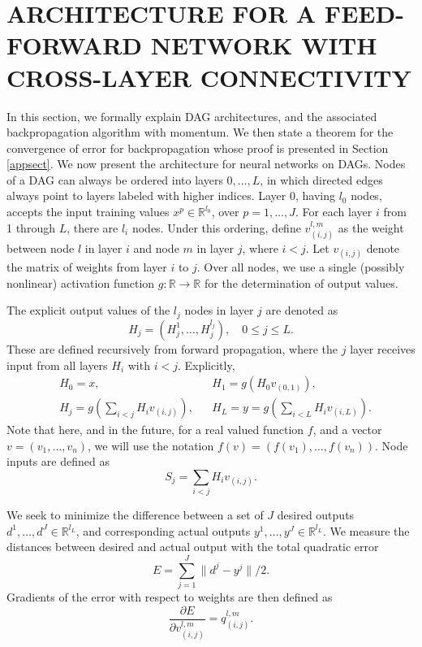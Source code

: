 \documentclass{jcmlatex}
\begin{document}
\section{ARCHITECTURE FOR A FEED-FORWARD NETWORK
WITH CROSS-LAYER CONNECTIVITY}\label{sec:architecture}

In this section, we formally explain  DAG architectures, and the associated backpropagation algorithm with momentum.  We then state a theorem for the convergence of error for backpropagation whose proof is presented in Section \ref{appsect}.
We now present the architecture for neural networks on DAGs. Nodes of a  DAG can always be ordered into layers $0, \dots, L$, in which directed edges always point to layers labeled with higher indices.  Layer 0, having $l_0$ nodes,  accepts the input training values $x^p \in \mathbb R^{l_0}$, over $ p = 1, \dots, J$.  For each layer $i$  from 1 through $L$, there are $l_i$ nodes. Under this ordering, define $v_{(i,j)}^{l,m}$ as the weight between node $l$ in layer $i$ and node $m$ in layer $j$, where $i<j$. Let $v_{(i,j)}$ denote the matrix of weights from layer $i$ to $j$. Over all nodes, we use a single (possibly nonlinear) activation function $g:\mathbb R\rightarrow \mathbb R$  for the determination of output values.

The explicit output values of the $l_j$ nodes in layer $j$ are denoted as
\begin{equation}
H_j = (H_j^1, \dots, H_j^{l_j}), \quad 0 \le j \le L.
\end{equation}
These are defined recursively from forward propagation, where the $j$ layer receives input from all layers $H_i$ with $i<j$. Explicitly,
\begin{align}
&H_0 = x,  &&H_1 = g\left(H_0 v_{(0,1)} \right),\\
&H_j = g\left(\sum_{i < j} H_iv_{(i,j)} \right),  &&H_L = y = g\left(\sum_{i <L } H_iv_{(i,L)} \right).\label{nodeeqn}
\end{align}
 Note that here, and in the future, for
a real valued function $f$, and a vector $v= (v_1, \dots, v_n)$, we will use
the notation $f(v) = (f(v_1), \dots, f(v_n))$. Node inputs are defined as
 \begin{equation}
 S_j= \sum_{i < j} H_iv_{(i,j)}.
 \end{equation}

We seek to minimize the difference between a set of  $J$ desired outputs $d^1, \dots, d^J \in \mathbb{R}^{l_L}$, and corresponding actual outputs  $y^1, \dots, y^J \in \mathbb{R}^{l_L}$. We measure the distances between desired and actual output with the total quadratic error
\begin{equation}
E = \sum_{j = 1}^J \|d^j-y^j\|/2. \label{generrordef}
\end{equation}
Gradients of the error with respect to weights are then defined as
\begin{equation}\label{defq}
\frac{\partial E}{\partial v_{(i,j)}^{l,m}} =  q_{(i,j)}^{l,m}.
\end{equation}
\end{document}

